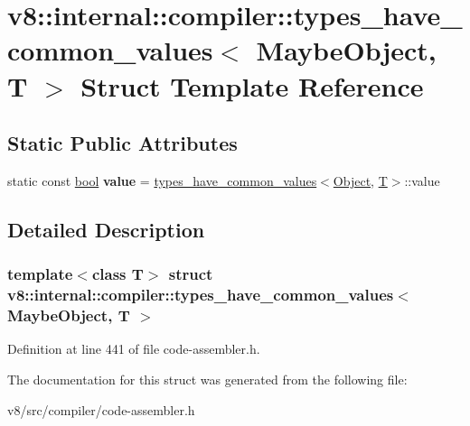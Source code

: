 \hypertarget{structv8_1_1internal_1_1compiler_1_1types__have__common__values_3_01MaybeObject_00_01T_01_4}{}\section{v8\+:\+:internal\+:\+:compiler\+:\+:types\+\_\+have\+\_\+common\+\_\+values$<$ Maybe\+Object, T $>$ Struct Template Reference}
\label{structv8_1_1internal_1_1compiler_1_1types__have__common__values_3_01MaybeObject_00_01T_01_4}
\subsection*{Static Public Attributes}
\begin{DoxyCompactItemize}
\item 
\mbox{\label{structv8_1_1internal_1_1compiler_1_1types__have__common__values_3_01MaybeObject_00_01T_01_4_a59fa93bb44d59c5cb3d6faad943afcd5}} 
static const \mbox{\hyperlink{classbool}{bool}} {\bfseries value} = \mbox{\hyperlink{structv8_1_1internal_1_1compiler_1_1types__have__common__values}{types\+\_\+have\+\_\+common\+\_\+values}}$<$\mbox{\hyperlink{classv8_1_1internal_1_1Object}{Object}}, \mbox{\hyperlink{classv8_1_1internal_1_1torque_1_1T}{T}}$>$\+::value
\end{DoxyCompactItemize}


\subsection{Detailed Description}
\subsubsection*{template$<$class T$>$\newline
struct v8\+::internal\+::compiler\+::types\+\_\+have\+\_\+common\+\_\+values$<$ Maybe\+Object, T $>$}



Definition at line 441 of file code-\/assembler.\+h.



The documentation for this struct was generated from the following file\+:\begin{DoxyCompactItemize}
\item 
v8/src/compiler/code-\/assembler.\+h\end{DoxyCompactItemize}
